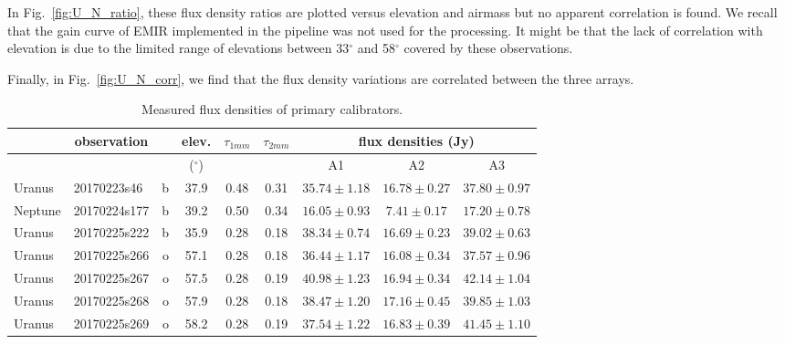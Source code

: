 In Fig.~\ref{fig:U_N_ratio}, these flux density ratios are plotted versus elevation and airmass but no apparent correlation is found.
We recall that the gain curve of EMIR implemented in the pipeline was not used for the processing. It might be
that the lack of correlation with elevation is due to
the limited range of elevations  between 33$^{\circ}$ and 58$^{\circ}$ covered by these observations.

Finally, in Fig.~\ref{fig:U_N_corr},  we find that the flux density
variations are correlated between the three arrays.

\begin{table}
\label{tab:fluxAp}
\caption[]{Measured flux densities of primary calibrators.}
\begin{tabular}{|l|l|r|c|c|c|c|c|c|}
\hline
\multicolumn{1}{|c}{} & \multicolumn{1}{|c}{observation} & \multicolumn{1}{|c}{}  & \multicolumn{1}{|c}{elev. } &  \multicolumn{1}{|c}{$\tau_{1mm} $}  &  \multicolumn{1}{|c}{$\tau_{2mm} $ } & \multicolumn{3}{|c|}{flux densities (Jy)}  \\
\hline
          &              &         &  ($^{\circ}$)   &      &      &              A1              &                         A2   &                       A3    \\
\hline
 Uranus   & 20170223s46  & b  & 37.9 & 0.48 & 0.31 & $     35.74 \pm        1.18$  & $     16.78 \pm        0.27$ & $     37.80 \pm       0.97$  \\
 Neptune  & 20170224s177 & b   & 39.2 & 0.50 & 0.34 & $     16.05 \pm        0.93$  & $      7.41 \pm        0.17$ & $     17.20 \pm       0.78$  \\
 Uranus   & 20170225s222 & b   & 35.9 & 0.28 & 0.18 & $     38.34 \pm        0.74$  & $     16.69 \pm        0.23$ & $     39.02 \pm       0.63$  \\
 Uranus   & 20170225s266 & o   & 57.1 & 0.28 & 0.18 & $     36.44 \pm        1.17$  & $     16.08 \pm        0.34$ & $     37.57 \pm       0.96$  \\
 Uranus   & 20170225s267 & o &  57.5 & 0.28 & 0.19 & $     40.98 \pm        1.23$  & $     16.94 \pm        0.34$ & $     42.14 \pm       1.04$  \\
 Uranus   & 20170225s268 & o &  57.9 & 0.28 & 0.18 & $     38.47 \pm        1.20$  & $     17.16 \pm        0.45$ & $     39.85 \pm       1.03$  \\
 Uranus   & 20170225s269 & o &  58.2 & 0.28 & 0.19 & $     37.54 \pm        1.22$  & $     16.83 \pm        0.39$ & $     41.45 \pm       1.10$  \\

\end{tabular}
\end{table}
